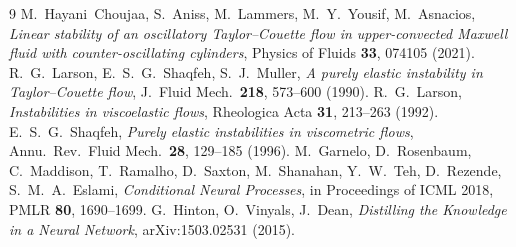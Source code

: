 \documentclass[11pt,a4paper]{article}
\begin{document}
\begin{thebibliography}{9}
M.~Hayani~Choujaa, S.~Aniss, M.~Lammers, M.~Y.~Yousif, M.~Asnacios,
\emph{Linear stability of an oscillatory Taylor--Couette flow in
upper-convected Maxwell fluid with counter-oscillating cylinders},
Physics of Fluids \textbf{33}, 074105 (2021).
R.~G.~Larson, E.~S.~G.~Shaqfeh, S.~J.~Muller,
\emph{A purely elastic instability in Taylor--Couette flow},
J.~Fluid Mech.~\textbf{218}, 573--600 (1990).
R.~G.~Larson,
\emph{Instabilities in viscoelastic flows},
Rheologica Acta \textbf{31}, 213--263 (1992).
E.~S.~G.~Shaqfeh,
\emph{Purely elastic instabilities in viscometric flows},
Annu.~Rev.~Fluid Mech.~\textbf{28}, 129--185 (1996).
M.~Garnelo, D.~Rosenbaum, C.~Maddison, T.~Ramalho, D.~Saxton,
M.~Shanahan, Y.~W.~Teh, D.~Rezende, S.~M.~A.~Eslami,
\emph{Conditional Neural Processes},
in Proceedings of ICML 2018, PMLR \textbf{80}, 1690--1699.
G.~Hinton, O.~Vinyals, J.~Dean,
\emph{Distilling the Knowledge in a Neural Network},
arXiv:1503.02531 (2015).
\end{thebibliography}
\end{document}

